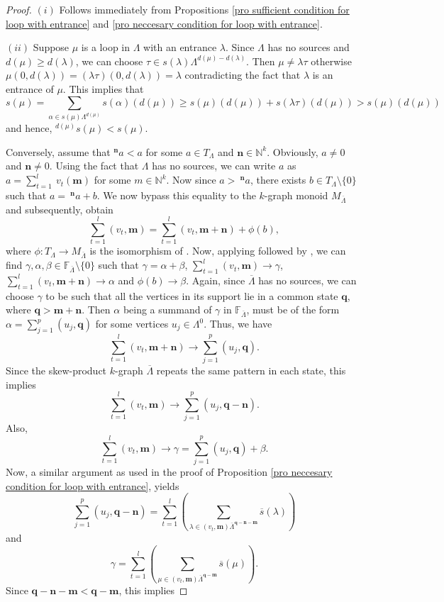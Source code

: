\documentclass[a4paper,reqno,12pt]{amsart}
\numberwithin{equation}{section}
\theoremstyle{definition}
\theoremstyle{remark}
\newcommand{\N}{\mathbf{n}}
\newcommand{\M}{\mathbf{m}}
\begin{document}
\begin{proof}
$(i)$ Follows immediately from Propositions \ref{pro sufficient condition for loop with entrance} and \ref{pro neccesary condition for loop with entrance}.

$(ii)$ Suppose $\mu$ is a loop in $\Lambda$ with an entrance $\lambda$. Since $\Lambda$ has no sources and $d(\mu)\ge d(\lambda)$, we can choose $\tau\in s(\lambda)\Lambda^{d(\mu)-d(\lambda)}$. Then $\mu\neq \lambda\tau$ otherwise $\mu(0,d(\lambda))=(\lambda\tau)(0,d(\lambda))=\lambda$ contradicting the fact that $\lambda$ is an entrance of $\mu$. This implies that\[s(\mu)=\displaystyle{\sum_{\alpha\in s(\mu)\Lambda^{d(\mu)}}} s(\alpha)(d(\mu))\ge s(\mu)(d(\mu))+s(\lambda\tau)(d(\mu))>s(\mu)(d(\mu))\] and hence, $^{d(\mu)}s(\mu) < s(\mu)$.

Conversely, assume that $^\N a< a$ for some $a\in T_\Lambda$ and $\N\in \mathbb{N}^k$. Obviously, $a\neq 0$ and $\N\neq 0$. Using the fact that $\Lambda$ has no sources, we can write $a$ as $a=\displaystyle{\sum_{t=1}^{l}}~ v_t(\M)$ for some $m\in \mathbb{N}^k$. Now since $a> ~^\N a$, there exists $b\in T_\Lambda\setminus \{0\}$ such that $a=~^\N a+b$. We now bypass this equality to the $k$-graph monoid $M_{\overline{\Lambda}}$ and subsequently, obtain \[\displaystyle{\sum_{t=1}^{l}} (v_t,\M)=\displaystyle{\sum_{t=1}^{l}} (v_t,\M+\N)+\phi(b),\] where $\phi:T_\Lambda\longrightarrow M_{\overline{\Lambda}}$ is the isomorphism of \cite[Theorem 3.16]{HMPS1}. Now, applying \cite[Lemma 3.5]{HMPS1} followed by \cite[Lemma 3.1]{HMPS1}, we can find $\gamma,\alpha,\beta\in \mathbb{F}_{\overline{\Lambda}}\setminus \{0\}$ such that $\gamma=\alpha+\beta$, $\displaystyle{\sum_{t=1}^{l}} (v_t,\M)\longrightarrow \gamma$, $\displaystyle{\sum_{t=1}^{l}} (v_t,\M+\N)\longrightarrow \alpha$ and $\phi(b)\longrightarrow \beta$. Again, since $\overline{\Lambda}$ has no sources, we can choose $\gamma$ to be such that all the vertices in its support lie in a common state $\mathbf{q}$, where $\mathbf{q}> \M+\N$. Then $\alpha$ being a summand of $\gamma$ in $\mathbb{F}_{\overline{\Lambda}}$, must be of the form $\alpha=\displaystyle{\sum_{j=1}^{p}}(u_j,\mathbf{q})$ for some vertices $u_j\in \Lambda^0$. Thus, we have \[\displaystyle{\sum_{t=1}^{l}} (v_t,\M+\N)\longrightarrow \displaystyle{\sum_{j=1}^{p}} (u_j,\mathbf{q}).\] Since the skew-product $k$-graph $\overline{\Lambda}$ repeats the same pattern in each state, this implies \[\displaystyle{\sum_{t=1}^{l}}(v_t,\M)\longrightarrow \displaystyle{\sum_{j=1}^{p}} (u_j,\mathbf{q}-\N).\] Also, \[\displaystyle{\sum_{t=1}^{l}} (v_t,\M)\longrightarrow \gamma=\displaystyle{\sum_{j=1}^{p}} (u_j,\mathbf{q})+\beta.\] Now, a similar argument as used in the proof of Proposition \ref{pro neccesary condition for loop with entrance}, yields \[\displaystyle{\sum_{j=1}^{p}} (u_j,\mathbf{q}-\N)=\displaystyle{\sum_{t=1}^{l}}\left(\displaystyle{\sum_{\lambda\in (v_t,\M)\overline{\Lambda}^{\mathbf{q}-\N-\M}}}\overline{s}(\lambda)\right)\] and \[\gamma=\displaystyle{\sum_{t=1}^{l}}\left(\displaystyle{\sum_{\mu\in (v_t,\M)\overline{\Lambda}^{\mathbf{q}-\M}}}\overline{s}(\mu)\right).\] Since $\mathbf{q}-\N-\M<\mathbf{q}-\M$, this implies 

\end{proof}
\end{document}
